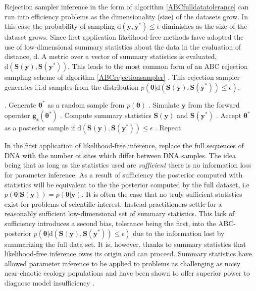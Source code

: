 Rejection sampler inference in the form of algorithm \ref{ABCfulldatatolerance} can run into efficiency problems as the dimensionality (size) of the datasets grow. In this case the probability of sampling $\text{d}(\bm{y},\bm{y^*})\leq\epsilon$ diminishes as the size of the dataset grows. Since first application \citep{Tavare1997} likelihood-free methods have adopted the use of low-dimensional summary statistics about the data in the evaluation of distance, $\text{d}$. A metric over a vector of summary statistics is evaluated, $\text{d}(\bm{S}(\bm{y}),\bm{S}(\bm{y^*}))$. This leads to the most common form of an ABC rejection sampling scheme of algorithm \ref{ABCrejectionsampler} \citep{Pritchard1999a}. This rejection sampler generates i.i.d samples from the distribution $p(\bm{\theta}|\text{d}(\bm{S}(\bm{y}),\bm{S}(\bm{y^*}))\leq\epsilon)$.

\begin{algorithm}[H]
	\caption{ }
	\begin{algorithmic}
		. Generate $\bm{\theta^*}$ as a random sample from $p(\bm{\theta})$		
		. Simulate $\bm{y}$ from the forward operator $\bm{g_s}(\bm{\theta^*})$		
		. Compute summary statistics $\bm{S}(\bm{y})$ and $\bm{S}(\bm{y^*})$		
		. Accept $\bm{\theta^*}$ as a posterior sample if $\text{d}(\bm{S}(\bm{y}),\bm{S}(\bm{y^*}))\leq\epsilon$		
		. Repeat
	\end{algorithmic}
	\label{ABCrejectionsampler}
\end{algorithm}

In the first application of likelihood-free inference, \citet{Tavare1997} replace the full sequences of DNA with the number of sites which differ between DNA samples. The idea being that as long as the statistics used are \textit{sufficient} there is no information loss for parameter inference. As a result of sufficiency the posterior computed with statistics will be equivalent to the the posterior computed by the full dataset, i.e $p(\bm{\theta}|\bm{S}(\bm{y})) = p(\bm{\theta}|\bm{y})$. It is often the case that no truly sufficient statistics exist for problems of scientific interest. Instead practitioners settle for a reasonably sufficient low-dimensional set of summary statistics. This lack of sufficiency introduces a second bias, tolerance being the first, into the ABC-posterior $p(\bm{\theta}|\text{d}(\bm{S}(\bm{y}),\bm{S}(\bm{y^*}))\leq\epsilon)$ due to the information lost by summarizing the full data set. It is, however, thanks to summary statistics that likelihood-free inference owes its origin and can proceed. Summary statistics have allowed parameter inference to be applied to problems as challenging as noisy near-chaotic ecology populations \citep{Wood2010} and have been shown to offer superior power to diagnose model insufficiency \citep{Ratmann2009,vrugt2013toward}.\par

